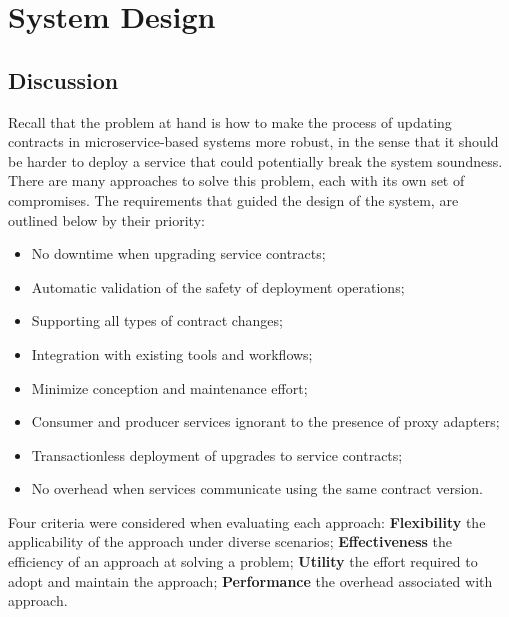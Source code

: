 
%

\chapter{System Design}
\label{cha:design}

\section{Discussion} %
\label{sec:discussion}

Recall that the problem at hand is how to make the process of updating contracts in
microservice-based systems more robust, in the sense that it should be harder to deploy a service that could
potentially break the system soundness.
There are many approaches to solve this problem, each with its own set of compromises.
The requirements that guided the design of the system, are outlined below by their priority:

\begin{itemize}
    \setlength\itemsep{0em}
    \item No downtime when upgrading service contracts;
    \item Automatic validation of the safety of deployment operations;
    \item Supporting all types of contract changes;
    \item Integration with existing tools and workflows;
    \item Minimize conception and maintenance effort;
    \item Consumer and producer services ignorant to the presence of proxy adapters;
    \item Transactionless deployment of upgrades to service contracts;
    \item No overhead when services communicate using the same contract version.
\end{itemize}

Four criteria were considered when evaluating each approach:
\textbf{Flexibility} the applicability of the approach under diverse scenarios;
\textbf{Effectiveness} the efficiency of an approach at solving a problem;
\textbf{Utility} the effort required to adopt and maintain the approach;
\textbf{Performance} the overhead associated with approach.

